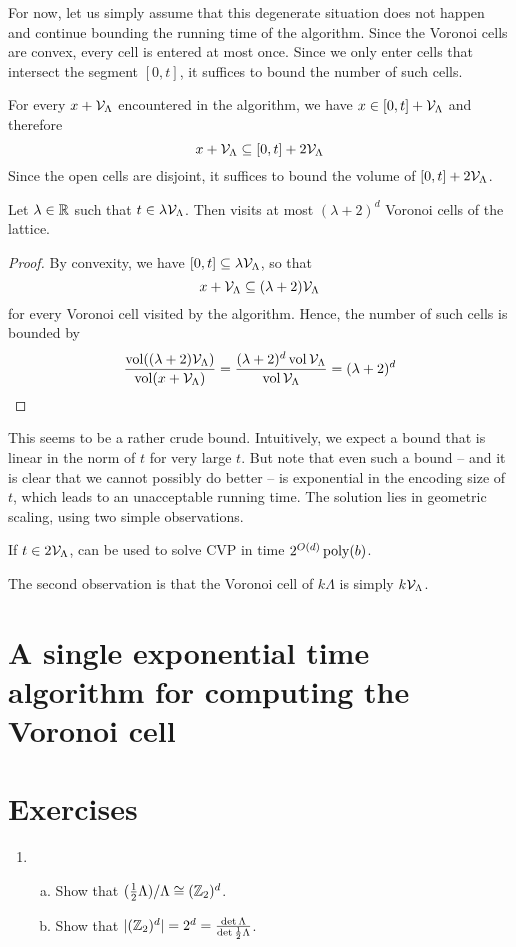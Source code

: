 For now, let us simply assume that this degenerate situation does not happen
and continue bounding the running time of the algorithm.
Since the Voronoi cells are convex, every cell is entered at most once.
Since we only enter cells that intersect the segment $[0,t]$,
it suffices to bound the number of such cells.

For every $x + \mathcal{V}_\Lambda$ encountered in the algorithm,
we have $x \in [0,t] + \mathcal{V}_\Lambda$
and therefore
\[
  x + \mathcal{V}_\Lambda \subseteq [0,t] + 2 \mathcal{V}_\Lambda
\]
Since the open cells are disjoint,
it suffices to bound the volume of $[0,t] + 2 \mathcal{V}_\Lambda$.
\begin{lemma}
  Let $\lambda \in \mathbb{R}$ such that $t \in \lambda \mathcal{V}_\Lambda$.
  Then  visits at most $(\lambda+2)^d$ Voronoi cells of the lattice.
\end{lemma}
\begin{proof}
  By convexity, we have $[0,t] \subseteq \lambda \mathcal{V}_\Lambda$,
  so that
  \[
    x + \mathcal{V}_\Lambda \subseteq (\lambda + 2) \mathcal{V}_\Lambda
  \]
  for every Voronoi cell visited by the algorithm.
  Hence, the number of such cells is bounded by
  \[
    \frac{\operatorname{vol}((\lambda + 2) \mathcal{V}_\Lambda)}{\operatorname{vol}(x + \mathcal{V}_\Lambda)}
      = \frac{(\lambda + 2)^d \operatorname{vol} \mathcal{V}_\Lambda }{\operatorname{vol} \mathcal{V}_\Lambda}
      = (\lambda + 2)^d \qedhere
  \]
\end{proof}
This seems to be a rather crude bound.
Intuitively, we expect a bound that is linear in the norm of $t$ for very large $t$.
But note that even such a bound -- and it is clear that we cannot possibly do better --
is exponential in the encoding size of $t$, which leads to an unacceptable running time.
The solution lies in geometric scaling, using two simple observations.
\begin{corollary}
  If $t \in 2\mathcal{V}_\Lambda$,
   can be used to solve CVP in time $2^{O(d)} \operatorname{poly}(b)$.
\end{corollary}
The second observation is that the Voronoi cell of $k \Lambda$ is simply $k \mathcal{V}_\Lambda$.

\begin{codebox}
\end{codebox}





\section{A single exponential time algorithm for computing the Voronoi cell}
\label{sec:voronoi-full-algorithm}


\section*{Exercises}

\begin{enumerate}
  \item
    \begin{enumerate}[(a)]
    \item Show that $(\frac{1}{2} \Lambda) / \Lambda \cong (\mathbb{Z}_2)^d$.

    \item Show that $|(\mathbb{Z}_2)^d| = 2^d = \frac{\det\Lambda}{\det \frac{1}{2} \Lambda}$.
    \end{enumerate}
\end{enumerate}
